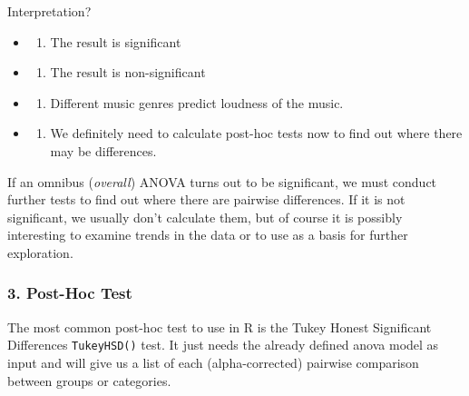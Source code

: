 \documentclass[
]{book}
\providecommand{\tightlist}{%
  \setlength{\itemsep}{0pt}\setlength{\parskip}{0pt}}
\begin{document}
Interpretation?

\begin{itemize}
\tightlist
\item
  \begin{enumerate}
  \def\labelenumi{(\Alph{enumi})}
  \tightlist
  \item
    The result is significant\\
  \end{enumerate}
\item
  \begin{enumerate}
  \def\labelenumi{(\Alph{enumi})}
  \setcounter{enumi}{1}
  \tightlist
  \item
    The result is non-significant\\
  \end{enumerate}
\item
  \begin{enumerate}
  \def\labelenumi{(\Alph{enumi})}
  \setcounter{enumi}{2}
  \tightlist
  \item
    Different music genres predict loudness of the music.\\
  \end{enumerate}
\item
  \begin{enumerate}
  \def\labelenumi{(\Alph{enumi})}
  \setcounter{enumi}{3}
  \tightlist
  \item
    We definitely need to calculate post-hoc tests now to find out where there may be differences.
  \end{enumerate}
\end{itemize}

If an omnibus (\emph{overall}) ANOVA turns out to be significant, we must conduct further tests to find out where there are pairwise differences.
If it is not significant, we usually don't calculate them, but of course it is possibly interesting to examine trends in the data or to use as a basis for further exploration.

\subsubsection*{3. Post-Hoc Test}\label{post-hoc-test}

The most common post-hoc test to use in R is the Tukey Honest Significant Differences \texttt{TukeyHSD()} test.
It just needs the already defined anova model as input and will give us a list of each (alpha-corrected) pairwise comparison between groups or categories.
\end{document}
